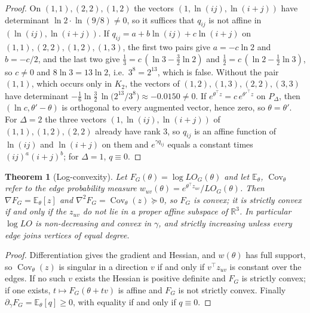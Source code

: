 \documentclass[a5paper, 10pt]{article}
\theoremstyle{plain}
\newtheorem{theorem}{Theorem}
\theoremstyle{remark}
\theoremstyle{definition}
\begin{document}
  \begin{proof}
  On $(1,1), (2,2), (1,2)$ the vectors $(1, \ln(ij), \ln(i+j))$ have
  determinant $\ln 2 \cdot \ln(9/8) \ne 0$, so it suffices that $q_{ij}$
  is not affine in $(\ln(ij), \ln(i+j))$. If
  $q_{ij} = a + b \ln(ij) + c \ln(i+j)$ on $(1,1), (2,2), (1,2), (1,3)$,
  the first two pairs give $a = -c \ln 2$ and $b = -c/2$, and the last two
  give $\tfrac13 = c\,(\ln 3 - \tfrac32 \ln 2)$ and
  $\tfrac12 = c\,(\ln 2 - \tfrac12 \ln 3)$, so $c \ne 0$ and
  $8 \ln 3 = 13 \ln 2$, i.e.\ $3^{8} = 2^{13}$, which is false. Without
  the pair $(1,1)$, which occurs only in $K_2$, the vectors of
  $(1,2), (1,3), (2,2), (3,3)$ have determinant
  $-\tfrac16 \ln\tfrac32 \,\ln\bigl(2^{13}/3^{8}\bigr) \approx -0.0150 \ne 0$.
  If $e^{\theta^{\top} z} = c\, e^{\theta'^{\top} z}$ on $P_{\Delta}$, then
  $(\ln c, \theta' - \theta)$ is orthogonal to every augmented vector,
  hence zero, so $\theta = \theta'$. For $\Delta = 2$ the three vectors
  $(1, \ln(ij), \ln(i+j))$ of $(1,1), (1,2), (2,2)$ already have rank $3$,
  so $q_{ij}$ is an affine function of $\ln(ij)$ and $\ln(i+j)$ on them and
  $e^{\gamma q_{ij}}$ equals a constant times $(ij)^{a}(i+j)^{b}$; for
  $\Delta = 1$, $q \equiv 0$.
  \end{proof}

  \begin{theorem}[Log-convexity]\label{thm:logconvex}
  Let $F_G(\theta) = \log LO_G(\theta)$ and let $\mathbb{E}_{\theta}$,
  $\operatorname{Cov}_{\theta}$ refer to the edge probability measure
  $w_{uv}(\theta) = e^{\theta^{\top} z_{uv}} / LO_G(\theta)$. Then
  $\nabla F_G = \mathbb{E}_{\theta}[z]$ and
  $\nabla^2 F_G = \operatorname{Cov}_{\theta}(z) \succeq 0$, so $F_G$ is
  convex; it is strictly convex if and only if the $z_{uv}$ do not lie in
  a proper affine subspace of $\mathbb{R}^3$. In particular
  $\log LO$ is non-decreasing and convex in $\gamma$, and strictly
  increasing unless every edge joins vertices of equal degree.
  \end{theorem}

  \begin{proof}
  Differentiation gives the gradient and Hessian, and $w(\theta)$ has full
  support, so $\operatorname{Cov}_{\theta}(z)$ is singular in a direction
  $v$ if and only if $v^{\top} z_{uv}$ is constant over the edges. If no
  such $v$ exists the Hessian is positive definite and $F_G$ is strictly
  convex; if one exists, $t \mapsto F_G(\theta + tv)$ is affine and $F_G$
  is not strictly convex. Finally
  $\partial_{\gamma} F_G = \mathbb{E}_{\theta}[q] \ge 0$, with equality
  if and only if $q \equiv 0$.
  \end{proof}
\end{document}
